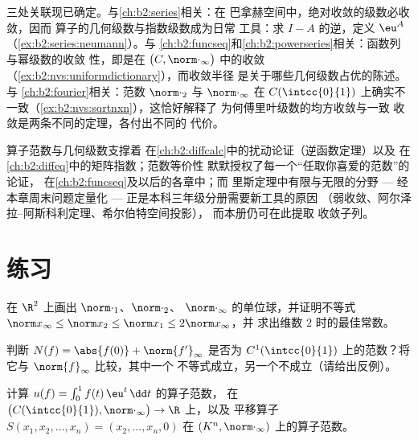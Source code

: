 \begin{remark}[本册内的几个视角]\label{rem:b2:nvs:perspectives}
三处关联现已确定。与\cref{ch:b2:series}相关：在
巴拿赫空间中，绝对收敛的级数必收敛，因而
算子的几何级数与指数级数成为日常
工具：求 $I - A$ 的逆，定义 $\eu^{A}$
（\cref{ex:b2:series:neumann}）。与
\cref{ch:b2:funcseq}和\cref{ch:b2:powerseries}相关：函数列与幂级数的收敛
性，即是在
$\bigl(C, \norm\cdot_\infty\bigr)$ 中的收敛
（\cref{ex:b2:nvs:uniformdictionary}），而收敛半径
是关于哪些几何级数占优的陈述。与
\cref{ch:b2:fourier}相关：范数
$\norm\cdot_2$ 与 $\norm\cdot_\infty$ 在
$C(\intcc{0}{1})$ 上确实不一致（\cref{ex:b2:nvs:sqrtnxn}），这恰好解释了
为何傅里叶级数的均方收敛与一致
收敛是两条不同的定理，各付出不同的
代价。
\end{remark}

\begin{remark}[本章的应用]
算子范数与几何级数支撑着
在\cref{ch:b2:diffcalc}中的扰动论证（逆函数定理）以及
在\cref{ch:b2:diffeq}中的矩阵指数；范数等价性
默默授权了每一个“任取你喜爱的范数”的论证，
在\cref{ch:b2:funcseq}及以后的各章中；而
里斯定理中有限与无限的分野 --- 经本章周末问题定量化 ---
正是本科三年级分册需要新工具的原因
（弱收敛、阿尔泽拉–阿斯科利定理、希尔伯特空间投影），
而本册仍可在此提取
收敛子列。
\end{remark}

\section{练习}

\begin{exercise}[$\star$]\label{exo:b2:nvs:1}
在 $\R^2$ 上画出 $\norm\cdot_1$、$\norm\cdot_2$、
$\norm\cdot_\infty$ 的单位球，并证明不等式 $\norm x_\infty
\leq \norm x_2 \leq \norm x_1 \leq 2\norm x_\infty$，并
求出维数 $2$ 时的最佳常数。
\end{exercise}

\begin{exercise}[$\star$]\label{exo:b2:nvs:2}
判断 $N(f) = \abs{f(0)} + \norm{f'}_\infty$ 是否为
$C^1(\intcc{0}{1})$ 上的范数？将它与 $\norm{f}_\infty$ 比较，其中一个
不等式成立，另一个不成立（请给出反例）。
\end{exercise}

\begin{exercise}[$\star$]\label{exo:b2:nvs:3}
计算 $u(f) = \int_0^1 f(t)\,\eu^t\,\dd t$ 的算子范数，
在 $\bigl(C(\intcc{0}{1}), \norm\cdot_\infty\bigr) \to \R$ 上，以及
平移算子 $S(x_1, x_2, \dots, x_n) = (x_2, \dots, x_n, 0)$ 在
$(K^n, \norm\cdot_\infty)$ 上的算子范数。
\end{exercise}

